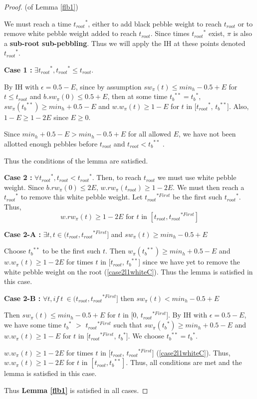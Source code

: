 \documentclass[oribib1]{llncs}
\newcommand{\troot}{t_{root}}
\newcommand{\troots}{{t_{root}}^*}
\newcommand{\tbss}{{t_b}^{**}}
\newcommand{\tbs}{{t_b}^{*}}
\newcommand{\trootsFirst}{{t_{root}}^{*First}}
\begin{document}
\begin{proof}(of Lemma \ref{flb1})


We must reach a time $\troots$, either to add black pebble weight to reach $\troot$ or to remove white pebble weight added to reach $\troot$. Since times $\troots$ exist, $\pi$ is also a {\bf sub-root sub-pebbling}. Thus we will apply the IH at these points denoted $\troots$.

\medskip

\noindent
{\bf Case 1 :} $\exists \troots, \troots \leq \troot$. 

By IH with $\epsilon=0.5-E$, since by assumption $sw_\pi(t) \leq min_h-0.5+E$ for $t \leq \troot$ and $b.sw_{\pi}(0) \leq 0.5+E$, then at some time $\tbss=\tbs$, $sw_\pi(\tbss ) \geq min_h+0.5-E$ and $w.w_\pi(t) \geq  1-E$ for $t$ in [$\troots$, $\tbss$]. Also, $1-E \geq 1-2E$ since $E \geq 0$. 

Since $min_h+0.5-E > min_h-0.5+E$ for all allowed $E$, we have not been allotted enough pebbles before $\troot$ and $\troot < \tbss$ . 

Thus the conditions of the lemma are satisfied.

\medskip
 
\noindent
{\bf Case 2 :} $\forall \troots, \troot < \troots$. Then, to reach $\troot$ we must use white pebble weight. Since $b.rw_{\pi}(0) \leq 2E$, $w.rw_\pi(\troot) \geq 1-2E$. We must then reach a $\troots$ to remove this white pebble weight. Let $\trootsFirst$ be the first such $\troots$. Thus,
\begin{equation}w.rw_\pi(t) \geq 1-2E\textrm{ for $t$ in }[\troot, \trootsFirst] \label{case2l1whiteC}\end{equation}



\noindent
{\bf Case 2-A :} $\exists t, t \in (\troot, \trootsFirst]$ and $sw_\pi(t) \geq min_h - 0.5+E$

Choose $\tbss$ to be the first such $t$. Then $w_\pi(\tbss) \geq min_h + 0.5-E$ and $w.w_\pi(t) \geq 1-2E$ for times $t$ in [$\troot$, $\tbss$] since we have yet to remove the white pebble weight on the root (\ref{case2l1whiteC}). Thus the lemma is satisfied in this case.

\medskip

\noindent
{\bf Case 2-B :} $\forall t, if~t~\in (\troot, \trootsFirst]$ then $sw_\pi(t) < min_h - 0.5+E$

Then $sw_\pi(t) \leq min_h-0.5+E$ for $t$ in [0, $\trootsFirst$]. By IH with $\epsilon=0.5-E$, we have some time $\tbs$ $>$ $\trootsFirst$ such that $sw_\pi(\tbs) \geq min_h + 0.5-E$ and $w.w_\pi(t) \geq 1-E$ for $t$ in [$\trootsFirst$,  $\tbs$]. We choose $\tbss = \tbs$. 

$w.w_\pi(t) \geq 1-2E$ for times $t$ in [$\troot$, $\trootsFirst$] (\ref{case2l1whiteC}). Thus, $w.w_\pi(t) \geq 1-2E$ for $t$ in $[\troot, \tbss]$. Thus, all conditions are met and the lemma is satisfied in this case.

Thus {\bf Lemma \ref{flb1}} is satisfied in all cases.
\end{proof}
\end{document}
